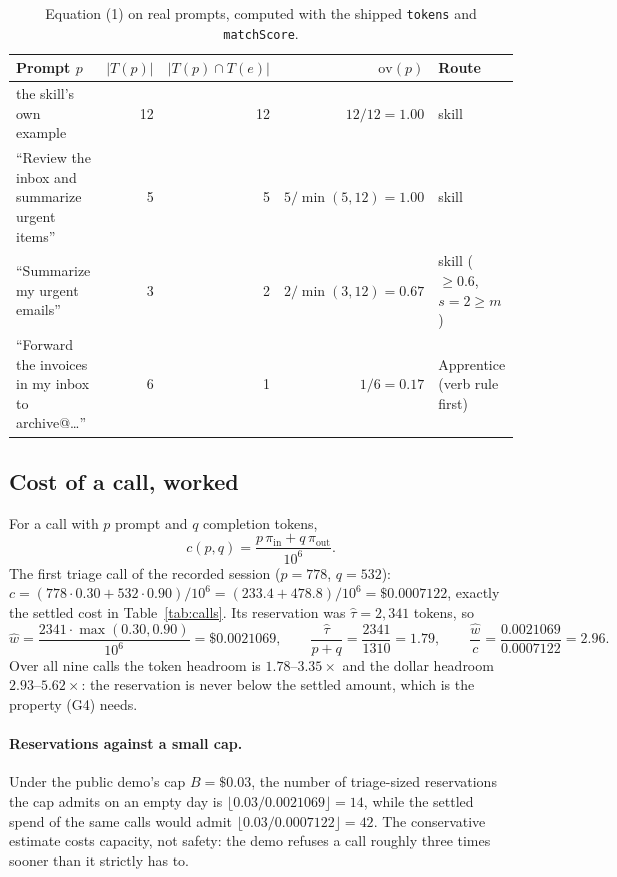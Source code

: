 \documentclass[11pt]{article}
\newcommand{\code}[1]{\texttt{#1}}
\begin{document}
\begin{table}[!htbp]
\centering\small
\caption{Equation (1) on real prompts, computed with the shipped \code{tokens} and \code{matchScore}.}
\label{tab:route}
\begin{tabularx}{\linewidth}{Xrrrl}
\toprule
Prompt $p$ & $|T(p)|$ & $|T(p)\cap T(e)|$ & $\mathrm{ov}(p)$ & Route\\
\midrule
the skill's own example & 12 & 12 & $12/12=1.00$ & skill\\
``Review the inbox and summarize urgent items'' & 5 & 5 & $5/\min(5,12)=1.00$ & skill\\
``Summarize my urgent emails'' & 3 & 2 & $2/\min(3,12)=0.67$ & skill ($\ge0.6$, $s=2\ge m$)\\
``Forward the invoices in my inbox to archive@\dots'' & 6 & 1 & $1/6=0.17$ & Apprentice (verb rule first)\\
\bottomrule
\end{tabularx}
\end{table}

\subsection{Cost of a call, worked}
For a call with $p$ prompt and $q$ completion tokens,
\begin{equation}
c(p,q)=\frac{p\,\pi_\text{in}+q\,\pi_\text{out}}{10^6}.
\end{equation}
The first triage call of the recorded session ($p=778$, $q=532$):
$c=(778\cdot0.30+532\cdot0.90)/10^6=(233.4+478.8)/10^6=\$0.0007122$, exactly the settled cost in
Table~\ref{tab:calls}. Its reservation was $\hat\tau=2{,}341$ tokens, so
\[
\hat w=\frac{2341\cdot\max(0.30,0.90)}{10^6}=\$0.0021069,\qquad
\frac{\hat\tau}{p+q}=\frac{2341}{1310}=1.79,\qquad
\frac{\hat w}{c}=\frac{0.0021069}{0.0007122}=2.96 .
\]
Over all nine calls the token headroom is $1.78$--$3.35\times$ and the dollar headroom $2.93$--$5.62\times$: the
reservation is never below the settled amount, which is the property (G4) needs.

\paragraph{Reservations against a small cap.} Under the public demo's cap $B=\$0.03$, the number of triage-sized
reservations the cap admits on an empty day is $\lfloor0.03/0.0021069\rfloor=14$, while the settled spend of the same
calls would admit $\lfloor0.03/0.0007122\rfloor=42$. The conservative estimate costs capacity, not safety: the
demo refuses a call roughly three times sooner than it strictly has to.
\end{document}
